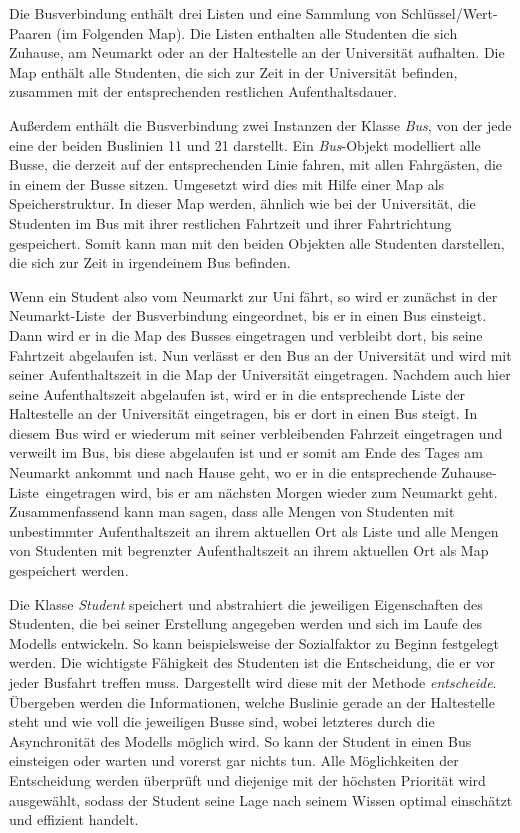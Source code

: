 \documentclass[12pt,a4paper]{scrartcl}
\begin{document}
Die Busverbindung enthält drei Listen und eine Sammlung von Schlüssel/Wert-Paaren (im Folgenden Map). Die Listen enthalten alle Studenten die sich Zuhause, am Neumarkt oder an der Haltestelle an der Universität aufhalten. Die Map enthält alle Studenten, die sich zur Zeit in der Universität befinden, zusammen mit der entsprechenden restlichen Aufenthaltsdauer.

Außerdem enthält die Busverbindung zwei Instanzen der Klasse \textit{Bus}, von der jede eine der beiden Buslinien 11 und 21 darstellt. Ein \textit{Bus}-Objekt modelliert alle Busse, die derzeit auf der entsprechenden Linie fahren, mit allen Fahrgästen, die in einem der Busse sitzen. Umgesetzt wird dies mit Hilfe einer Map als Speicherstruktur. In dieser Map werden, ähnlich wie bei der Universität, die Studenten im Bus mit ihrer restlichen Fahrtzeit und ihrer Fahrtrichtung gespeichert. Somit kann man mit den beiden Objekten alle Studenten darstellen, die sich zur Zeit in irgendeinem Bus befinden.

Wenn ein Student also vom Neumarkt zur Uni fährt, so wird er zunächst in der \glqq Neumarkt-Liste\grqq~der Busverbindung eingeordnet, bis er in einen Bus einsteigt. Dann wird er in die Map des Busses eingetragen und verbleibt dort, bis seine Fahrtzeit abgelaufen ist. Nun verlässt er den Bus an der Universität und wird mit seiner Aufenthaltszeit in die Map der Universität eingetragen. Nachdem auch hier seine Aufenthaltszeit abgelaufen ist, wird er in die entsprechende Liste der Haltestelle an der Universität eingetragen, bis er dort in einen Bus steigt. In diesem Bus wird er wiederum mit seiner verbleibenden Fahrzeit eingetragen und verweilt im Bus, bis diese abgelaufen ist und er somit am Ende des Tages am Neumarkt ankommt und nach Hause geht, wo er in die entsprechende \glqq Zuhause-Liste\grqq~eingetragen wird, bis er am nächsten Morgen wieder zum Neumarkt geht. Zusammenfassend kann man sagen, dass alle Mengen von Studenten mit unbestimmter Aufenthaltszeit an ihrem aktuellen Ort als Liste und alle Mengen von Studenten mit begrenzter Aufenthaltszeit an ihrem aktuellen Ort als Map gespeichert werden.

Die Klasse \textit{Student} speichert und abstrahiert die jeweiligen Eigenschaften des Studenten, die bei seiner Erstellung angegeben werden und sich im Laufe des Modells entwickeln. So kann beispielsweise der Sozialfaktor zu Beginn festgelegt werden. Die wichtigste Fähigkeit des Studenten ist die Entscheidung, die er vor jeder Busfahrt treffen muss. Dargestellt wird diese mit der Methode \textit{entscheide}. Übergeben werden die Informationen, welche Buslinie gerade an der Haltestelle steht und wie voll die jeweiligen Busse sind, wobei letzteres durch die Asynchronität des Modells möglich wird. So kann der Student in einen Bus einsteigen oder warten und vorerst gar nichts tun. Alle Möglichkeiten der Entscheidung werden überprüft und diejenige mit der höchsten Priorität wird ausgewählt, sodass der Student seine Lage nach seinem Wissen optimal einschätzt und effizient handelt. 
\end{document}
